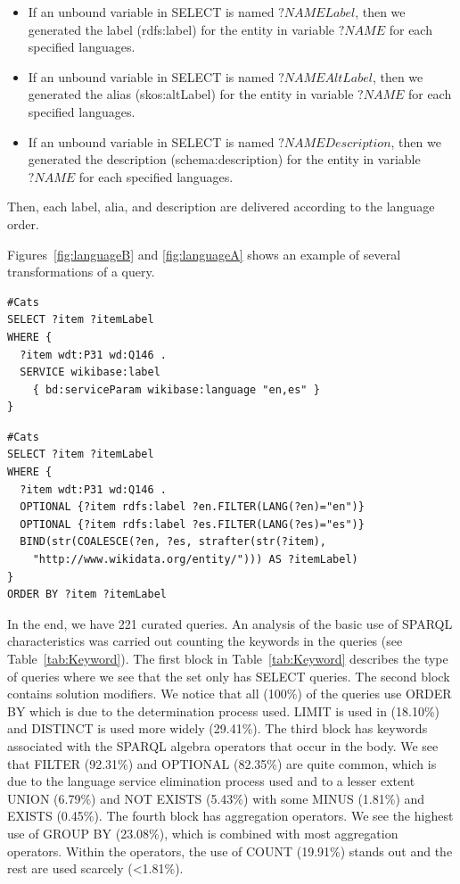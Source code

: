 \documentclass[runningheads]{llncs}
\begin{document}
\begin{itemize}
	\item If an unbound variable in SELECT is named $?NAMELabel$, then we generated the label (rdfs:label) for the entity in variable $ ?NAME $ for each specified languages.
	\item If an unbound variable in SELECT is named $ ?NAMEAltLabel $, then we generated the alias (skos:altLabel) for the entity in variable $ ?NAME $ for each specified languages.
	\item If an unbound variable in SELECT is named $ ?NAMEDescription $, then we generated the description (schema:description) for the entity in variable $ ?NAME $ for each specified languages.
\end{itemize}
Then, each label, alia, and description are delivered according to the language order. 

Figures~\ref{fig:languageB} and \ref{fig:languageA} shows an example of several transformations of a query.

\begin{lstlisting}[captionpos=b, caption=Query transformation. Before., label=fig:languageB,
basicstyle=\ttfamily,frame=single]
#Cats
SELECT ?item ?itemLabel
WHERE {
  ?item wdt:P31 wd:Q146 .
  SERVICE wikibase:label
    { bd:serviceParam wikibase:language "en,es" }
}
\end{lstlisting}

\begin{lstlisting}[captionpos=b, caption=Query transformation. After., label=fig:languageA,
basicstyle=\ttfamily,frame=single]
#Cats
SELECT ?item ?itemLabel
WHERE {
  ?item wdt:P31 wd:Q146 .
  OPTIONAL {?item rdfs:label ?en.FILTER(LANG(?en)="en")}
  OPTIONAL {?item rdfs:label ?es.FILTER(LANG(?es)="es")}
  BIND(str(COALESCE(?en, ?es, strafter(str(?item),
    "http://www.wikidata.org/entity/"))) AS ?itemLabel)
}
ORDER BY ?item ?itemLabel
\end{lstlisting}

In the end, we have 221 curated queries. An analysis of the basic use of SPARQL characteristics was carried out counting the keywords in the queries (see Table~\ref{tab:Keyword}). The first block in Table~\ref{tab:Keyword} describes the type of queries where we see that the set only has SELECT queries.
The second block contains solution modifiers. We notice that all (100\%) of the queries use ORDER BY which is due to the determination process used. LIMIT is used in (18.10\%) and DISTINCT is used more widely (29.41\%).
The third block has keywords associated with the SPARQL algebra operators that occur in the body. We see that FILTER (92.31\%) and OPTIONAL (82.35\%) are quite common, which is due to the language service elimination process used and to a lesser extent UNION (6.79\%) and NOT EXISTS (5.43\%) with some MINUS (1.81\%) and EXISTS (0.45\%).
The fourth block has aggregation operators. We see the highest use of GROUP BY (23.08\%), which is combined with most aggregation operators. Within the operators, the use of COUNT (19.91\%) stands out and the rest are used scarcely (<1.81\%).
\end{document}
